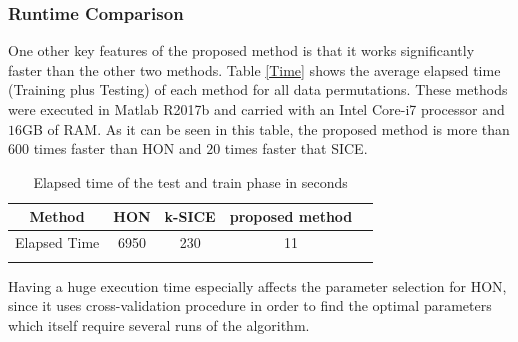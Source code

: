 \documentclass[preprint,12pt]{elsarticle}
\begin{document}
	\subsubsection{Runtime Comparison}
	One other key features of the proposed method is that it works significantly faster than the other two methods. Table \eqref{Time} shows the average elapsed time (Training plus Testing) of each method for all data permutations. These methods were executed in Matlab R2017b and carried with an Intel Core-i7 processor and $16$GB of RAM. As it can be seen in this table, the proposed method is more than $600$ times faster than HON and $20$ times faster that SICE.   
	\begin{table}
		\begin{center}
			\caption{Elapsed time of the test and train phase in seconds}
			\begin{tabular}{@{}c*{4}{c}}
				\hline\hline
				Method& HON & k-SICE& proposed method 
				\\
				\hline
				Elapsed Time  &6950& 230 & 11 
				\\
				\hline\hline
				\label{Time}
			\end{tabular}
		\end{center}
	\end{table}
	Having a huge execution time especially affects the parameter selection for HON, since it uses cross-validation procedure in order to find the optimal parameters which itself require several runs of the algorithm. 
	
	
	
\end{document}
